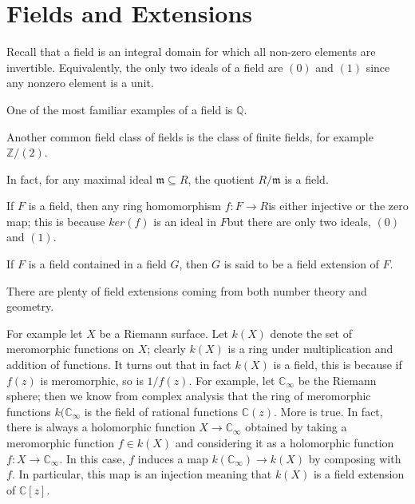 \chapter{Fields and Extensions}
Recall that a field is an integral domain for which all non-zero elements are
invertible. Equivalently, the only two ideals of a field are $(0)$ and $(1)$
since any nonzero element is a unit.


\begin{example}
One of the most familiar examples of a field is $\mathbb{Q}$.
\end{example}

\begin{example}
Another common field class of fields is the class of finite fields, for example
$\mathbb{Z}/(2)$.
\end{example}

\begin{exercise} In fact, for any maximal ideal $\mathfrak{m}\subseteq R$, the
quotient $R/\mathfrak{m}$ is a field. 
\end{exercise}

\begin{example} If $F$ is a field, then any ring homomorphism $f:F\rightarrow
R$is either injective or the zero map; this is because $ker(f)$ is an ideal in
$F$but there are only two ideals, $(0)$ and $(1)$.
\end{example}

\begin{definition} If $F$ is a field contained in a field $G$, then $G$ is said
to be a field extension of $F$.
\end{definition}

There are plenty of field extensions coming from both number theory and
geometry.

\begin{example} For example let $X$ be a Riemann surface. Let $k(X)$ denote the
set of meromorphic functions on $X$; clearly $k(X)$ is a ring under
multiplication and addition of functions. It turns out that in fact $k(X)$ is a
field, this is because if $f(z)$ is meromorphic, so is $1/f(z)$. For example,
let $\mathbb{C}_{\infty}$ be the Riemann sphere; then we know from complex
analysis that the ring of meromorphic functions $k(\mathbb{C}_{\infty}$ is the
field of rational functions $\mathbb{C}(z)$. More is true. In fact, there is
always a holomorphic function $X\rightarrow \mathbb{C}_{\infty}$ obtained by
taking a meromorphic function $f\in k(X)$ and considering it as a holomorphic
function $f:X\rightarrow\mathbb{C}_{\infty}$. In this case, $f$ induces a map
$k(\mathbb{C}_{\infty})\rightarrow k(X)$ by composing with $f$. In particular,
this map is an injection meaning that $k(X)$ is a field extension of
$\mathbb{C}[z]$.
\end{example}

